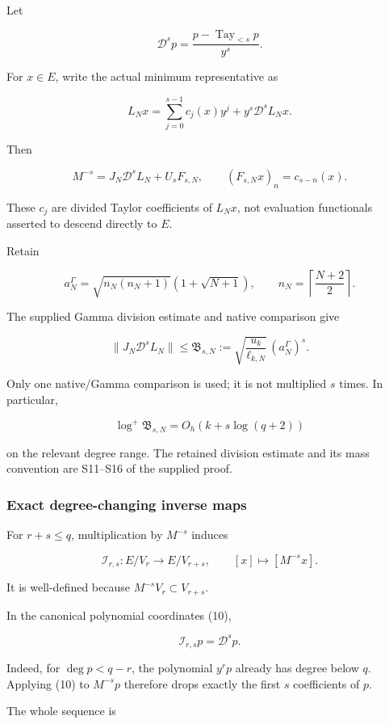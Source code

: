 \documentclass[11pt]{article}
\begin{document}
Let

\[
\mathscr D^sp=
\frac{p-\operatorname{Tay}_{<s}p}{y^s}.
\]

For \(x\in E\), write the actual minimum representative as

\[
L_Nx
=
\sum_{j=0}^{s-1}c_j(x)y^j+y^s\mathscr D^sL_Nx.
\]

Then

\[
\boxed{
M^{-s}
=
J_N\mathscr D^sL_N+U_sF_{s,N},
\qquad
(F_{s,N}x)_n=c_{s-n}(x).
}
\tag{22}
\]

These \(c_j\) are divided Taylor coefficients of \(L_Nx\), not evaluation functionals asserted to descend directly to \(E\).

Retain

\[
a_N^\Gamma=
\sqrt{n_N(n_N+1)}(1+\sqrt{N+1}),
\qquad
n_N=\left\lceil\frac{N+2}{2}\right\rceil.
\]

The supplied Gamma division estimate and native comparison give

\[
\boxed{
\|J_N\mathscr D^sL_N\|
\le
\mathfrak B_{s,N}
:=
\sqrt{\frac{u_k}{\ell_{k,N}}}\,(a_N^\Gamma)^s.
}
\tag{23}
\]

Only one native/Gamma comparison is used; it is not multiplied \(s\) times. In particular,

\[
\log^+\mathfrak B_{s,N}
=
O_h(k+s\log(q+2))
\]

on the relevant degree range. The retained division estimate and its mass convention are S11--S16 of the supplied proof.

\subsubsection{Exact degree-changing inverse maps}\label{exact-degree-changing-inverse-maps}

For \(r+s\le q\), multiplication by \(M^{-s}\) induces

\[
\mathcal I_{r,s}:E/V_r\longrightarrow E/V_{r+s},
\qquad
[x]\longmapsto[M^{-s}x].
\]

It is well-defined because \(M^{-s}V_r\subset V_{r+s}\).

In the canonical polynomial coordinates (10),

\[
\boxed{
\mathcal I_{r,s}p=\mathscr D^sp.
}
\tag{24}
\]

Indeed, for \(\deg p<q-r\), the polynomial \(y^rp\) already has degree below \(q\). Applying (10) to \(M^{-s}p\) therefore drops exactly the first \(s\) coefficients of \(p\).

The whole sequence is
\end{document}
